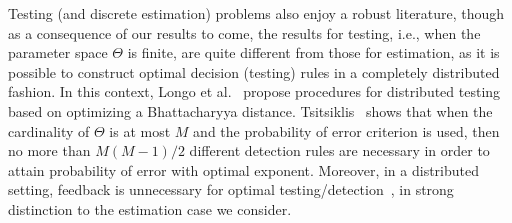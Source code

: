 Testing (and discrete estimation) problems also enjoy a robust literature,
though as a consequence of our results to come, the results for testing,
i.e., when the parameter space $\Theta$ is finite, are quite different from
those for estimation, as it is possible to construct optimal decision
(testing) rules in a completely distributed fashion. In this context, Longo
et al.~\cite{52470} propose procedures for distributed testing based on
optimizing a Bhattacharyya distance.
Tsitsiklis~\cite{tsitsiklis1988decentralized} shows that when the
cardinality of $\Theta$ is at most $M$ and the probability of error
criterion is used, then no more than $M(M-1)/2$ different detection rules
are necessary in order to attain probability of error with optimal exponent.
Moreover, in a distributed setting, feedback is unnecessary for optimal
testing/detection~\cite{5751320}, in strong distinction to the estimation
case we consider.





